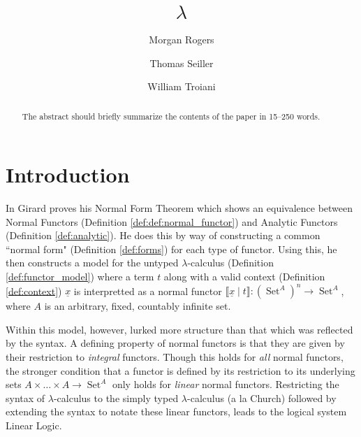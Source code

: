 \documentclass[runningheads]{llncs}
\newcommand{\lto}{\longrightarrow}
\DeclareMathOperator{\set}{Set}
\begin{document}
%
\title{$\lambda$}
%
%
\author{Morgan Rogers \and
Thomas Seiller \and
William Troiani}
%
%
%
\maketitle              %
%
\begin{abstract}
The abstract should briefly summarize the contents of the paper in
15--250 words.

\end{abstract}

\section{Introduction}
In \cite{Girard} Girard proves his Normal Form Theorem \cite{??} which shows an equivalence between Normal Functors (Definition \ref{def:def:normal_functor}) and Analytic Functors (Definition \ref{def:analytic}). He does this by way of constructing a common ``normal form" (Definition \ref{def:forms}) for each type of functor. Using this, he then constructs a model for the untyped $\lambda$-calculus (Definition \ref{def:functor_model}) where a term $t$ along with a valid context (Definition \ref{def:context}) $\underline{x}$ is interpretted as a normal functor $\llbracket \underline{x} \mid t \rrbracket: (\set^A)^n \lto \set^A$, where $A$ is an arbitrary, fixed, countably infinite set.

Within this model, however, lurked more structure than that which was reflected by the syntax. A defining property of normal functors is that they are given by their restriction to \textit{integral} functors. Though this holds for \textit{all} normal functors, the stronger condition that a functor is defined by its restriction to its underlying sets $A \times \ldots \times A \lto \set^A$ only holds for \textit{linear} normal functors. Restricting the syntax of $\lambda$-calculus to the simply typed $\lambda$-calculus (a la Church) followed by extending the syntax to notate these linear functors, leads to the logical system Linear Logic.
\end{document}
